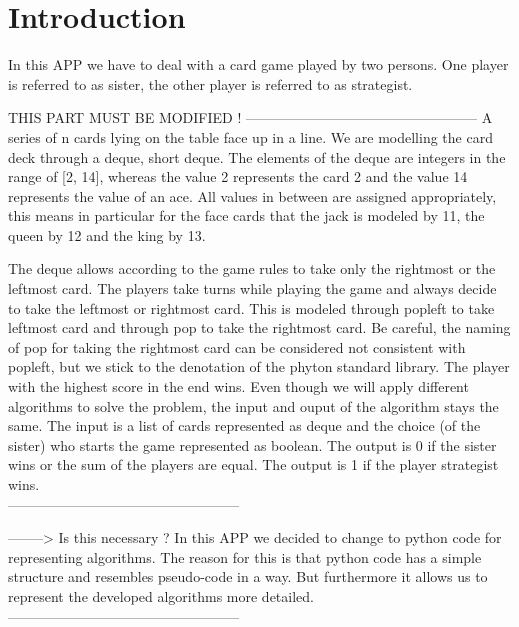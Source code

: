 \documentclass[a4paper,12pt,fleqn]{article}
\begin{document}

\thispagestyle{empty}
\tableofcontents
\newpage
\section{Introduction}
In this APP we have to deal with a card game played by two persons.
One player is referred to as sister, the other player is referred to as strategist.

THIS PART MUST BE MODIFIED !
--------------------------------------------------
A series of n cards lying on the table face up in a line. We are modelling
the card deck through a \gls{deque}, short deque. The elements of the deque are integers
in the range of [2, 14], whereas the value 2 represents the card 2 and the
value 14 represents the value of an ace. All values in between are assigned
appropriately, this means in particular for the face cards that the jack
is modeled by 11, the queen by 12 and the king by 13.

The deque allows according to the game rules to take only the
rightmost or the leftmost card. The players take turns while playing the
game and always decide to take the leftmost or rightmost card. This is
modeled through \gls{popleft} to take leftmost card and through \gls{pop}
to take the rightmost card. Be careful, the naming of \gls{pop} for taking
the rightmost card can be considered not consistent with \gls{popleft}, but we
stick to the denotation of the phyton standard library. The player with
the highest score in the end wins. Even though we will apply different
algorithms to solve the problem, the input and ouput of the algorithm stays the same.
The input is a list of cards represented as deque and the choice (of the sister)
who starts the game represented as boolean. The output is 0 if the sister wins
or the sum of the players are equal. The output is 1 if the
player strategist wins.\\
--------------------------------------------------

--------> Is this necessary ?
In this APP we decided to change to python code for representing algorithms.
The reason for this is that python code has a simple structure and resembles
pseudo-code in a way. But furthermore it allows us to represent the developed
algorithms more detailed.\\
--------------------------------------------------
\end{document}
